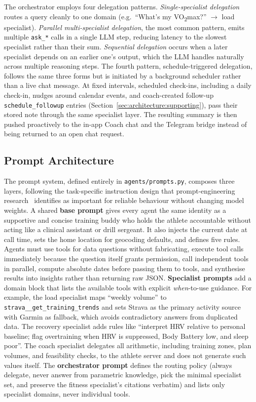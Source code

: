 The orchestrator employs four delegation patterns. \textit{Single-specialist delegation} routes a query cleanly to one domain (e.g.\ ``What's my VO\textsubscript{2}max?'' $\to$ load specialist). \textit{Parallel multi-specialist delegation}, the most common pattern, emits multiple \texttt{ask\_*} calls in a single LLM step, reducing latency to the slowest specialist rather than their sum. \textit{Sequential delegation} occurs when a later specialist depends on an earlier one's output, which the LLM handles naturally across multiple reasoning steps. The fourth pattern, schedule-triggered delegation, follows the same three forms but is initiated by a background scheduler rather than a live chat message. At fixed intervals, scheduled check-ins, including a daily check-in, nudges around calendar events, and coach-created follow-up \texttt{schedule\_followup} entries (Section~\ref{sec:architecture:supporting}), pass their stored note through the same specialist layer. The resulting summary is then pushed proactively to the in-app Coach chat and the Telegram bridge instead of being returned to an open chat request.

\subsection{Prompt Architecture}\label{sec:agents:prompts}

The prompt system, defined entirely in \texttt{agents/prompts.py}, composes three layers, following the task-specific instruction design that prompt-engineering research~\citep{sahoo_prompt_2024} identifies as important for reliable behaviour without changing model weights. A shared \textbf{base prompt} gives every agent the same identity as a supportive and concise training buddy who holds the athlete accountable without acting like a clinical assistant or drill sergeant. It also injects the current date at call time, sets the home location for geocoding defaults, and defines five rules. Agents must use tools for data questions without fabricating, execute tool calls immediately because the question itself grants permission, call independent tools in parallel, compute absolute dates before passing them to tools, and synthesise results into insights rather than returning raw JSON. \textbf{Specialist prompts} add a domain block that lists the available tools with explicit \textit{when}-to-use guidance. For example, the load specialist maps ``weekly volume'' to \texttt{strava\_\_get\_training\_trends} and sets Strava as the primary activity source with Garmin as fallback, which avoids contradictory answers from duplicated data. The recovery specialist adds rules like ``interpret HRV relative to personal baseline; flag overtraining when HRV is suppressed, Body Battery low, and sleep poor''. The coach specialist delegates all arithmetic, including training zones, plan volumes, and feasibility checks, to the athlete server and does not generate such values itself. The \textbf{orchestrator prompt} defines the routing policy (always delegate, never answer from parametric knowledge, pick the minimal specialist set, and preserve the fitness specialist's citations verbatim) and lists only specialist domains, never individual tools.

